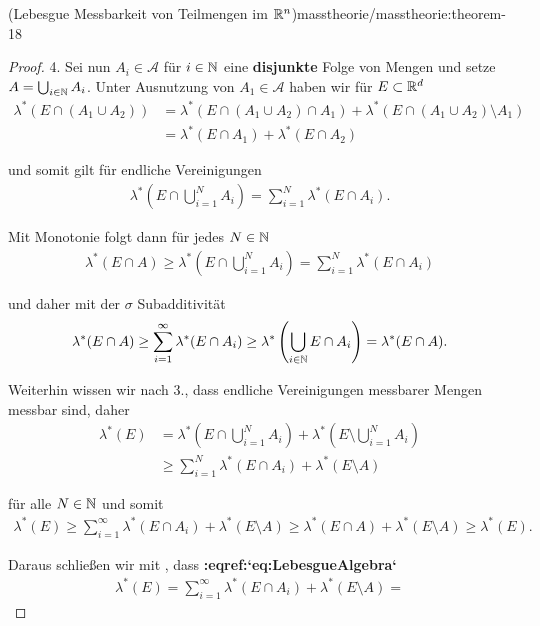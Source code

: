 \begin{theorem}{(Lebesgue Messbarkeit von Teilmengen im \protect\(\mathbb{R}^n\protect\))}{masstheorie/masstheorie:theorem-18}
\begin{proof}
\par
4. Sei nun \(A_i\in\mathcal{A}\) für \(i\in\mathbb{N}\) eine \textbf{disjunkte} Folge von Mengen und setze \(A=\bigcup_{i\in\mathbb{N}} A_i\). Unter Ausnutzung von \(A_1\in\mathcal{A}\) haben wir für \(E\subset\mathbb{R}^d\)
\begin{align*}
\lambda^\ast(E\cap (A_1\cup A_2)) &= \lambda^\ast(E\cap(A_1\cup A_2)\cap A_1) + \lambda^\ast(E\cap(A_1\cup A_2)\setminus A_1)\\
&=
\lambda^\ast(E\cap A_1) + \lambda^\ast(E\cap A_2)
\end{align*}
\par
und somit gilt für endliche Vereinigungen
\begin{align*}
\lambda^\ast(E\cap \bigcup_{i=1}^N A_i) = \sum_{i=1}^N \lambda^\ast(E\cap A_i).
\end{align*}
\par
Mit Monotonie folgt dann für jedes \(N\in\mathbb{N}\)
\begin{align*}
\lambda^\ast(E\cap A)\geq \lambda^\ast(E\cap \bigcup_{i=1}^N A_i) = \sum_{i=1}^N \lambda^\ast(E\cap A_i)
\end{align*}
\par
und daher mit der \(\sigma\) Subadditivität
\begin{align}\label{equation:masstheorie/masstheorie:eq:LebesgueAlgebra}
\lambda^\ast(E\cap A) \geq \sum_{i=1}^\infty \lambda^\ast(E\cap A_i)\geq \lambda^\ast\left(\bigcup_{i\in\mathbb{N}} E\cap A_i\right) = \lambda^\ast(E\cap A).
\end{align}
\par
Weiterhin wissen wir nach 3., dass endliche Vereinigungen messbarer Mengen messbar sind, daher
\begin{align*}
\lambda^\ast(E) &= \lambda^\ast\left(E\cap \bigcup_{i=1}^N A_i\right) + \lambda^\ast\left(E\setminus \bigcup_{i=1}^N A_i\right)\\
&\geq
\sum_{i=1}^N \lambda^\ast(E\cap A_i) + \lambda^\ast(E\setminus A)
\end{align*}
\par
für alle \(N\in\mathbb{N}\) und somit
\begin{align*}
\lambda^\ast(E)\geq \sum_{i=1}^\infty \lambda^\ast(E\cap A_i) + \lambda^\ast(E\setminus A)\geq 
\lambda^\ast(E\cap A) + \lambda^\ast(E\setminus A) \geq \lambda^\ast(E).
\end{align*}
\par
Daraus schließen wir mit , dass {\color{red}\bfseries{}:eqref:`eq:LebesgueAlgebra`}
\begin{align*}
\lambda^\ast(E) = \sum_{i=1}^\infty \lambda^\ast(E\cap A_i) + \lambda^\ast(E\setminus A) =

\end{align*}
\end{proof}
\end{theorem}

